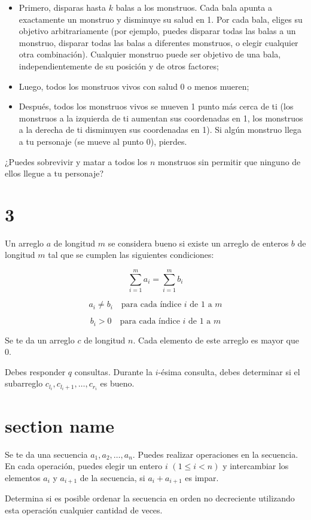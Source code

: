\documentclass{article}
\begin{document}
\begin{itemize}
    \item Primero, disparas hasta $k$ balas a los monstruos. Cada bala apunta a exactamente un monstruo y disminuye su salud en 1. Por cada bala, eliges su objetivo arbitrariamente (por ejemplo, puedes disparar todas las balas a un monstruo, disparar todas las balas a diferentes monstruos, o elegir cualquier otra combinación). Cualquier monstruo puede ser objetivo de una bala, independientemente de su posición y de otros factores;
    \item Luego, todos los monstruos vivos con salud 0 o menos mueren;
    \item Después, todos los monstruos vivos se mueven 1 punto más cerca de ti (los monstruos a la izquierda de ti aumentan sus coordenadas en 1, los monstruos a la derecha de ti disminuyen sus coordenadas en 1). Si algún monstruo llega a tu personaje (se mueve al punto 0), pierdes.
\end{itemize}

¿Puedes sobrevivir y matar a todos los $n$ monstruos sin permitir que ninguno de ellos llegue a tu personaje?


\section{3}%
\label{sec:3}

Un arreglo $a$ de longitud $m$ se considera bueno si existe un arreglo de enteros $b$ de longitud $m$ tal que se cumplen las siguientes condiciones:

\[
\sum_{i=1}^{m} a_i = \sum_{i=1}^{m} b_i
\]

\[
a_i \neq b_i \quad \text{para cada índice } i \text{ de } 1 \text{ a } m
\]

\[
b_i > 0 \quad \text{para cada índice } i \text{ de } 1 \text{ a } m
\]

Se te da un arreglo $c$ de longitud $n$. Cada elemento de este arreglo es mayor que 0.

Debes responder $q$ consultas. Durante la $i$-ésima consulta, debes determinar si el subarreglo $c_{l_i}, c_{l_i+1}, \ldots, c_{r_i}$ es bueno.


\section{section name}%
\label{sec:section name}

Se te da una secuencia $a_1, a_2, \ldots, a_n$. Puedes realizar operaciones en la secuencia. En cada operación, puedes elegir un entero $i$ $(1 \leq i < n)$ y intercambiar los elementos $a_i$ y $a_{i+1}$ de la secuencia, si $a_i + a_{i+1}$ es impar.

Determina si es posible ordenar la secuencia en orden no decreciente utilizando esta operación cualquier cantidad de veces.
\end{document}
